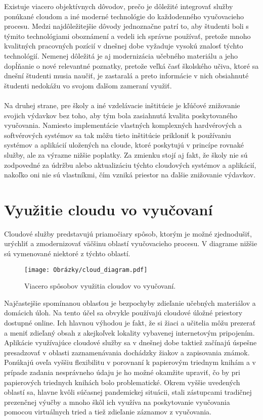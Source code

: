 \documentclass[10pt,slovak,a4paper]{article}%
\begin{document}
Existuje viacero objektívnych dôvodov, prečo je dôležité integrovať služby ponúkané cloudom a iné moderné technológie do každodenného vyučovacieho procesu. Medzi najdôležitejšie dôvody jednoznačne patrí to, aby študenti boli s týmito technológiami oboznámení a vedeli ich správne používať, pretože mnoho kvalitných pracovných pozícií v dnešnej dobe vyžaduje vysokú znalosť týchto technológií\cite{Babu_enrichingeducation}. Nemenej dôležitá je aj modernizácia učebného materiálu a jeho dopĺňanie o nové relevantné poznatky, pretože veľká časť školského učiva, ktoré sa dnešní študenti musia naučiť, je zastaralá a preto informácie v nich obsiahnuté študenti nedokážu vo svojom ďalšom zameraní využiť.
\\
\\
Na druhej strane, pre školy a iné vzdelávacie inštitúcie je kľúčové znižovanie svojich výdavkov bez toho, aby tým bola zasiahnutá kvalita poskytovaného vyučovania. Namiesto implementácie vlastných komplexných hardvérových a softvérových systémov sa tak môžu tieto inštitúcie prikloniť k používaniu systémov a aplikácií uložených na cloude, ktoré poskytujú v princípe rovnaké služby, ale za výrazne nižšie poplatky\cite{Mhouti_benefits_challenges}. Za zmienku stojí aj fakt, že školy nie sú zodpovedné za údržbu alebo aktualizáciu týchto cloudových systémov a aplikácií, nakoľko oni nie sú vlastníkmi, čím vzniká priestor na ďalšie znižovanie výdavkov\cite{Narkar_cloud-basededucation}.


\section{Využitie cloudu vo vyučovaní}

Cloudové služby predstavujú priamočiary spôsob, ktorým je možné zjednodušiť, urýchliť a zmodernizovať väčšinu oblastí vyučovacieho procesu. V diagrame nižšie sú vymenované niektoré z týchto oblastí.

\begin{figure}[h]
\texttt{[image: Obrázky/cloud\_diagram.pdf]}
\caption{Viacero spôsobov využitia cloudov vo vyučovaní.}
\end{figure}

Najčastejšie spomínanou oblasťou je bezpochyby zdieľanie učebných materiálov a domácich úloh. Na tento účel sa obvykle používajú cloudové úložné priestory dostupné online. Ich hlavnou výhodou je fakt, že si žiaci a učitelia môžu prezerať a meniť zdieľaný obsah z akejkoľvek lokality vybavenej internetovým pripojením. Aplikácie využívajúce cloudové služby sa v dnešnej dobe taktiež začínajú úspešne presadzovať v oblasti zaznamenávania dochádzky žiakov a zapisovania známok. Ponúkajú oveľa vyššiu flexibilitu v porovnaní k papierovým triednym knihám a v prípade zadania nesprávneho údaju je ho možné okamžite upraviť, čo by pri papierových triednych knihách bolo problematické. Okrem vyššie uvedených oblastí sa, hlavne kvôli súčasnej pandemickej situácii, stali zástupcami tradičnej prezenčnej výučby a mnoho škôl ich využíva na poskytovanie vyučovania pomocou virtuálnych tried a tiež zdieľanie záznamov z vyučovania.
\end{document}
